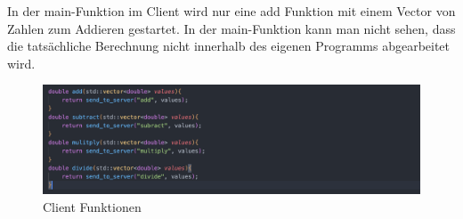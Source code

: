 \documentclass[german,oneside,color]{htldipl}
\begin{document}
In der main-Funktion im Client wird nur eine add Funktion mit einem Vector von Zahlen zum Addieren gestartet. In der main-Funktion kann man nicht sehen, dass die tatsächliche Berechnung nicht innerhalb des eigenen Programms abgearbeitet wird.
\\
\newpage
\begin{figure}[h!]
  \centering
  \includegraphics[width=1\textwidth]{images/Client_functions.png}
  \caption{Client Funktionen}
  \label{Client_functions}
\end{figure}   
\end{document}
